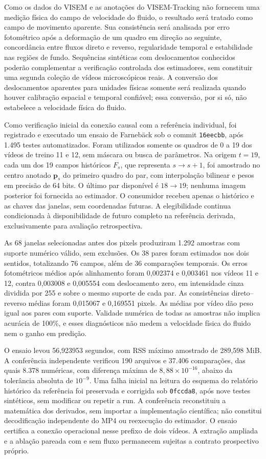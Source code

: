 Como os dados do VISEM e as anotações do VISEM-Tracking não fornecem uma medição física do campo de velocidade do fluido, o resultado será tratado como campo de movimento aparente. Sua consistência será analisada por erro fotométrico após a deformação de um quadro em direção ao seguinte, concordância entre fluxos direto e reverso, regularidade temporal e estabilidade nas regiões de fundo. Sequências sintéticas com deslocamentos conhecidos poderão complementar a verificação controlada dos estimadores, sem constituir uma segunda coleção de vídeos microscópicos reais. A conversão dos deslocamentos aparentes para unidades físicas somente será realizada quando houver calibração espacial e temporal confiável; essa conversão, por si só, não estabelece a velocidade física do fluido.


Como verificação inicial da conexão causal com a referência individual, foi
registrado e executado um ensaio de Farnebäck sob o commit \texttt{16eecbb},
após 1.495 testes automatizados. Foram utilizados somente os quadros de 0 a 19
dos vídeos de treino 11 e 12, sem máscara ou busca de parâmetros. Na origem
$t=19$, cada um dos 19 campos históricos $F_s$, que representa $s\to s+1$,
foi amostrado no centro anotado $\mathbf p_s$ do primeiro quadro do par, com
interpolação bilinear e pesos em precisão de 64 bits. O último par disponível
é $18\to19$; nenhuma imagem posterior foi fornecida ao estimador. O consumidor
recebeu apenas o histórico e as chaves das janelas, sem coordenadas futuras.
A elegibilidade continua condicionada à disponibilidade de futuro completo
na referência derivada, exclusivamente para avaliação retrospectiva.

As 68 janelas selecionadas antes dos pixels produziram 1.292 amostras com
suporte numérico válido, sem exclusões. Os 38 pares foram estimados nos dois
sentidos, totalizando 76 campos, além de 36 comparações temporais. Os erros
fotométricos médios após alinhamento foram 0,002374 e 0,003461 nos vídeos 11
e 12, contra 0,003008 e 0,005554 com deslocamento zero, em intensidade cinza
dividida por 255 e sobre o mesmo suporte de cada par. As consistências
direto--reverso médias foram 0,015067 e 0,169551 pixels. As médias por vídeo
dão peso igual aos pares com suporte. Validade numérica de todas as amostras
não implica acurácia de 100\%, e esses diagnósticos não medem a velocidade
física do fluido nem o ganho em predição.

O ensaio levou 56,923953 segundos, com RSS máximo amostrado de 289,598 MiB.
A conferência independente verificou 190 arquivos e 37.406 comparações,
das quais 8.378 numéricas, com diferença máxima de $8{,}88\times10^{-16}$,
abaixo da tolerância absoluta de $10^{-9}$. Uma falha inicial na leitura do
esquema do relatório histórico da referência foi preservada e corrigida sob
\texttt{0fccda8}, após nove testes sintéticos, sem modificar ou repetir a run.
A conferência reconstituiu a matemática dos derivados, sem importar a
implementação científica; não constitui decodificação independente do MP4 ou
reexecução do estimador. O ensaio certifica a conexão operacional nesse
prefixo de dois vídeos. A extração ampliada e a ablação pareada com e sem fluxo
permanecem sujeitas a contrato prospectivo próprio.


